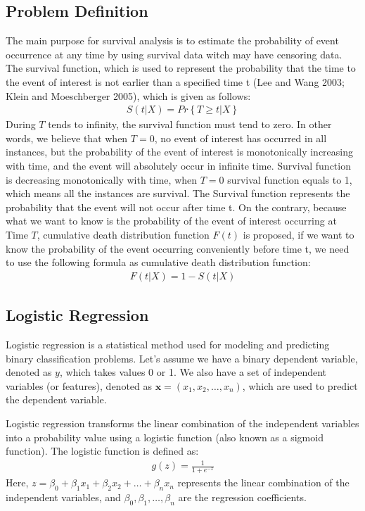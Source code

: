 \documentclass[conference]{IEEEconf}
\begin{document}
\subsection{Problem Definition}
The main purpose for survival analysis is to estimate the probability of event occurrence at any time by using survival data witch may have censoring data. The survival function, which is used to represent the probability that the time to the event of interest is not earlier than a specified time t (Lee and Wang 2003; Klein and Moeschberger 2005), which is given as follows:
\begin{eqnarray}
	S(t|X) = Pr\left \{T\ge t|X\right \}
\end{eqnarray}
During $T$ tends to infinity, the survival function must tend to zero. In other words, we believe that when $T=0$, no event of interest has occurred in all instances, but the probability of the event of interest is monotonically increasing with time, and the event will absolutely occur in infinite time. Survival function is decreasing monotonically with time, when $T=0$ survival function equals to 1, which means all the instances are survival. The Survival function represents the probability that the event will not occur after time t. On the contrary, because what we want to know is the probability of the event of interest occurring at Time $T$, cumulative death distribution function $F(t)$ is proposed, if we want to know the probability of the event occurring conveniently before time t, we need to use the following formula as cumulative death distribution function:
\begin{eqnarray}
	F(t|X) = 1 - S(t|X)
\end{eqnarray}

\subsection{Logistic Regression}

Logistic regression is a statistical method used for modeling and predicting binary classification problems. Let's assume we have a binary dependent variable, denoted as $y$, which takes values 0 or 1. We also have a set of independent variables (or features), denoted as $\mathbf{x} = (x_1, x_2, \ldots, x_n)$, which are used to predict the dependent variable.

Logistic regression transforms the linear combination of the independent variables into a probability value using a logistic function (also known as a sigmoid function). The logistic function is defined as:
\begin{eqnarray}
	g(z) = \frac{1}{1 + e^{-z}}
\end{eqnarray}
Here, $z = \beta_0 + \beta_1x_1 + \beta_2x_2 + \ldots + \beta_nx_n$ represents the linear combination of the independent variables, and $\beta_0, \beta_1, \ldots, \beta_n$ are the regression coefficients.
\end{document}
